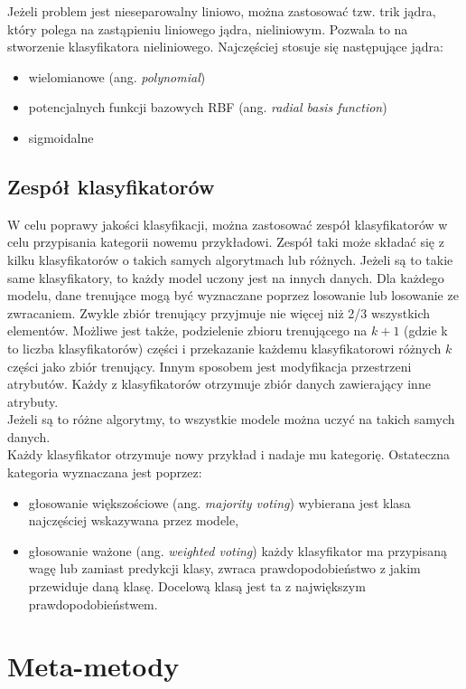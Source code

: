 Jeżeli problem jest nieseparowalny  liniowo, można zastosować tzw. trik jądra, który polega na zastąpieniu liniowego jądra, nieliniowym. Pozwala to na stworzenie klasyfikatora nieliniowego. Najczęściej stosuje się następujące jądra:
\begin{itemize}
	\item wielomianowe (ang. \textit{polynomial})
	\item potencjalnych funkcji bazowych RBF (ang. \textit{radial basis function})
	\item sigmoidalne
\end{itemize}

  	
\subsection{Zespół klasyfikatorów}
W celu poprawy jakości klasyfikacji, można zastosować zespół klasyfikatorów w celu przypisania kategorii nowemu przykładowi. Zespół taki może składać się z kilku klasyfikatorów o takich samych algorytmach lub różnych. Jeżeli są to takie same klasyfikatory, to każdy model uczony jest na innych danych. Dla każdego modelu, dane trenujące mogą być wyznaczane poprzez losowanie lub losowanie ze zwracaniem. Zwykle zbiór trenujący przyjmuje nie więcej niż 2/3 wszystkich elementów. Możliwe jest także, podzielenie zbioru trenującego na $k+1$ (gdzie k to liczba klasyfikatorów) części i przekazanie każdemu klasyfikatorowi różnych $k$ części jako zbiór trenujący. Innym sposobem jest modyfikacja przestrzeni atrybutów. Każdy z klasyfikatorów otrzymuje zbiór danych zawierający inne atrybuty. \\
Jeżeli są to różne algorytmy, to wszystkie modele można uczyć na takich samych danych. \\
Każdy klasyfikator otrzymuje nowy przykład i nadaje mu kategorię. Ostateczna kategoria wyznaczana jest poprzez:
\begin{itemize}
	\item głosowanie większościowe (ang. \textit{majority voting}) wybierana jest klasa najczęściej wskazywana przez modele,
	\item głosowanie ważone (ang. \textit{weighted voting}) każdy klasyfikator ma przypisaną wagę lub zamiast predykcji klasy, zwraca prawdopodobieństwo z jakim przewiduje daną klasę. Docelową klasą jest ta z największym prawdopodobieństwem.
\end{itemize} 
\section{Meta-metody}
